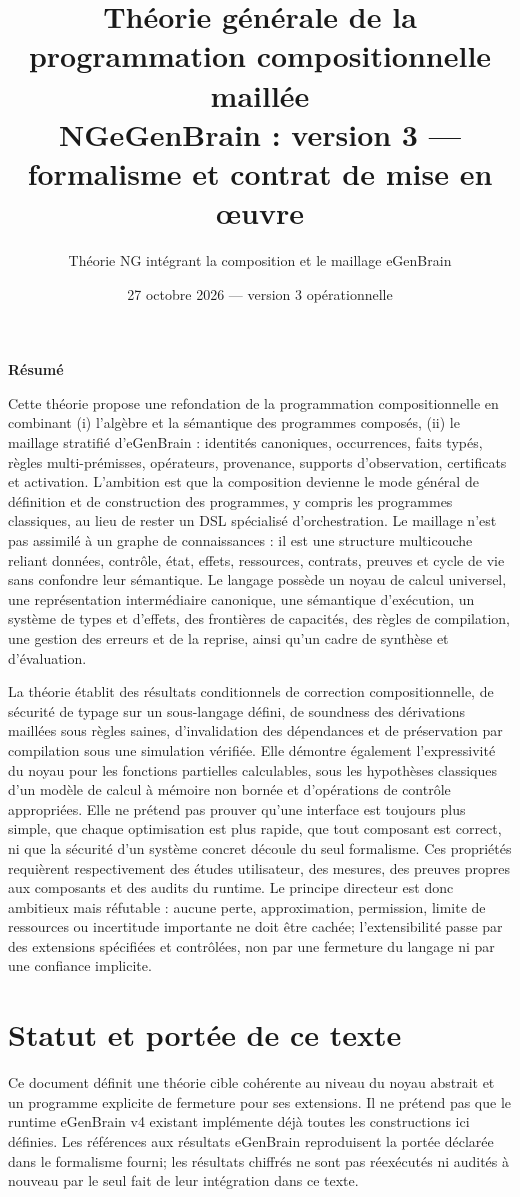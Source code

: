 \documentclass[11pt,a4paper,openany]{book}
\title{Théorie générale de la programmation compositionnelle maillée\\\large NGeGenBrain : version 3 — formalisme et contrat de mise en œuvre}
\author{Théorie NG intégrant la composition et le maillage eGenBrain}
\date{27 octobre 2026 — version 3 opérationnelle}
\theoremstyle{definition}
\theoremstyle{plain}
\theoremstyle{remark}
\newenvironment{abstract}{\begin{center}\bfseries Résumé\end{center}\quotation}{\endquotation}
\begin{document}
\frontmatter
\maketitle
\begin{abstract}
Cette théorie propose une refondation de la programmation compositionnelle en combinant (i) l'algèbre et la sémantique des programmes composés, (ii) le maillage stratifié d'eGenBrain : identités canoniques, occurrences, faits typés, règles multi-prémisses, opérateurs, provenance, supports d'observation, certificats et activation. L'ambition est que la composition devienne le mode général de définition et de construction des programmes, y compris les programmes classiques, au lieu de rester un DSL spécialisé d'orchestration. Le maillage n'est pas assimilé à un graphe de connaissances : il est une structure multicouche reliant données, contrôle, état, effets, ressources, contrats, preuves et cycle de vie sans confondre leur sémantique. Le langage possède un noyau de calcul universel, une représentation intermédiaire canonique, une sémantique d'exécution, un système de types et d'effets, des frontières de capacités, des règles de compilation, une gestion des erreurs et de la reprise, ainsi qu'un cadre de synthèse et d'évaluation.

La théorie établit des résultats conditionnels de correction compositionnelle, de sécurité de typage sur un sous-langage défini, de soundness des dérivations maillées sous règles saines, d'invalidation des dépendances et de préservation par compilation sous une simulation vérifiée. Elle démontre également l'expressivité du noyau pour les fonctions partielles calculables, sous les hypothèses classiques d'un modèle de calcul à mémoire non bornée et d'opérations de contrôle appropriées. Elle ne prétend pas prouver qu'une interface est toujours plus simple, que chaque optimisation est plus rapide, que tout composant est correct, ni que la sécurité d'un système concret découle du seul formalisme. Ces propriétés requièrent respectivement des études utilisateur, des mesures, des preuves propres aux composants et des audits du runtime. Le principe directeur est donc ambitieux mais réfutable : aucune perte, approximation, permission, limite de ressources ou incertitude importante ne doit être cachée; l'extensibilité passe par des extensions spécifiées et contrôlées, non par une fermeture du langage ni par une confiance implicite.
\end{abstract}
\chapter*{Statut et portée de ce texte}
Ce document définit une théorie cible cohérente au niveau du noyau abstrait et un programme explicite de fermeture pour ses extensions. Il ne prétend pas que le runtime eGenBrain v4 existant implémente déjà toutes les constructions ici définies. Les références aux résultats eGenBrain reproduisent la portée déclarée dans le formalisme fourni; les résultats chiffrés ne sont pas réexécutés ni audités à nouveau par le seul fait de leur intégration dans ce texte.
\end{document}

